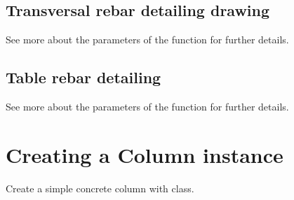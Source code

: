 \documentclass[a4paper,10pt,english]{sphinxmanual}
\begin{document}
\subsection{Transversal rebar detailing drawing}
\label{\detokenize{usage:transversal-rebar-detailing-drawing}}
\begin{sphinxVerbatim}[commandchars=\\\{\}]
\end{sphinxVerbatim}

\sphinxAtStartPar
See more about the parameters of the {\hyperref[\detokenize{API:etacad.beam.Beam.draw_transverse_rebar_detailing}]{}} function for further details.


\subsection{Table rebar detailing}
\label{\detokenize{usage:table-rebar-detailing}}
\begin{sphinxVerbatim}[commandchars=\\\{\}]
\end{sphinxVerbatim}

\sphinxAtStartPar
See more about the parameters of the  function for further details.


\section{Creating a Column instance}
\label{\detokenize{usage:creating-a-column-instance}}
\sphinxAtStartPar
Create a simple concrete column with {\hyperref[\detokenize{API:etacad.column.Column}]{}} class.
\end{document}

